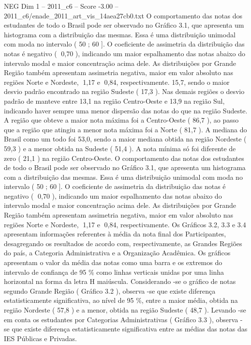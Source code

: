 \begin{textsample}{NEG Dim 1 – 2011\_c6 – Score -3.00 – 2011\_c6/enade\_2011\_art\_vis\_14aea27cb0.txt}
O comportamento das notas dos estudantes de todo o Brasil pode ser observado no Gráfico 3.1, que apresenta um histograma com a distribuição das mesmas.
Essa é uma distribuição unimodal com moda no intervalo ( 50 ; 60 ].
O coeficiente de assimetria da distribuição das notas é negativo ( 0,70 ), indicando um maior espalhamento das notas abaixo do intervalo modal e maior concentração acima dele.
As distribuições por Grande Região também apresentam assimetria negativa, maior em valor absoluto nas regiões Norte e Nordeste, 1,17 e 0,84, respectivamente. 15,7, sendo o maior desvio padrão encontrado na região Sudeste ( 17,3 ).
Nas demais regiões o desvio padrão de manteve entre 13,1 na região Centro-Oeste e 13,9 na região Sul, indicando haver sempre uma menor dispersão das notas do que na região Sudeste.
A região que obteve a maior nota máxima foi a Centro-Oeste ( 86,7 ), ao passo que a região que atingiu a menor nota máxima foi a Norte ( 81,7 ).
A mediana do Brasil como um todo foi 53,0, sendo a maior mediana obtida na região Nordeste ( 59,3 ) e a menor obtida na Sudeste ( 51,4 ).
A nota mínima só foi diferente de zero ( 21,1 ) na região Centro-Oeste.
O comportamento das notas dos estudantes de todo o Brasil pode ser observado no Gráfico 3.1, que apresenta um histograma com a distribuição das mesmas.
Essa é uma distribuição unimodal com moda no intervalo ( 50 ; 60 ].
O coeficiente de assimetria da distribuição das notas é negativo ( 0,70 ), indicando um maior espalhamento das notas abaixo do intervalo modal e maior concentração acima dele.
As distribuições por Grande Região também apresentam assimetria negativa, maior em valor absoluto nas regiões Norte e Nordeste, 1,17 e 0,84, respectivamente.
Os Gráficos 3.2, 3.3 e 3.4 apresentam informações referentes à média da nota final dos Participantes, desagregando os resultados de acordo com, respectivamente, as Grandes Regiões do país, a Categoria Administrativa e a Organização Acadêmica.
Os gráficos apresentam o valor da média das notas como uma barra e os extremos do intervalo de confiança de 95 \% como linhas verticais unidas por uma linha horizontal na forma da letra H maiúscula.
Considerando -se o gráfico de notas segundo Grande Região ( Gráfico 3.2 ), observa -se que existe diferença estatisticamente significativa, ao nível de 95 \%, entre a maior média, obtida na região Nordeste ( 57,8 ) e a menor, obtida na região Sudeste ( 48,7 ).
Levando -se em conta os estudantes por Categorias Administrativas ( Gráfico 3.3 ), observa -se que existe diferença estatisticamente significativa entre as médias das notas das IES Públicas e Privadas.

\end{textsample}
